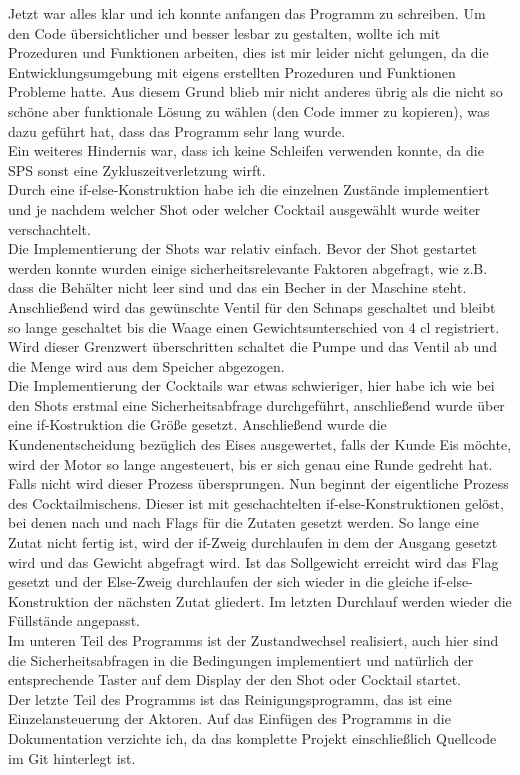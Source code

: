 \documentclass[10pt,a4paper]{report}
\begin{document}
	Jetzt war alles klar und ich konnte anfangen das Programm zu schreiben. Um den Code übersichtlicher und besser lesbar zu gestalten, wollte ich mit Prozeduren und Funktionen arbeiten, dies ist mir leider nicht gelungen, da die Entwicklungsumgebung mit eigens erstellten Prozeduren und Funktionen Probleme hatte. Aus diesem Grund blieb mir nicht anderes übrig als die nicht so schöne aber funktionale Lösung zu wählen (den Code immer zu kopieren), was dazu geführt hat, dass das Programm sehr lang wurde.\\
	Ein weiteres Hindernis war, dass ich keine Schleifen verwenden konnte, da die SPS sonst eine Zykluszeitverletzung wirft.\\
	Durch eine if-else-Konstruktion habe ich die einzelnen Zustände implementiert und je nachdem welcher Shot oder welcher Cocktail ausgewählt wurde weiter verschachtelt.\\
	Die Implementierung der Shots war relativ einfach. Bevor der Shot gestartet werden konnte wurden einige sicherheitsrelevante Faktoren abgefragt, wie z.B. dass die Behälter nicht leer sind und das ein Becher in der Maschine steht. Anschließend wird das gewünschte Ventil für den Schnaps geschaltet und bleibt so lange geschaltet bis die Waage einen Gewichtsunterschied von 4 cl registriert. Wird dieser Grenzwert überschritten schaltet die Pumpe und das Ventil ab und die Menge wird aus dem Speicher abgezogen.\\
	Die Implementierung der Cocktails war etwas schwieriger, hier habe ich wie bei den Shots erstmal eine Sicherheitsabfrage durchgeführt, anschließend wurde über eine if-Kostruktion die Größe gesetzt. Anschließend wurde die Kundenentscheidung bezüglich des Eises ausgewertet, falls der Kunde Eis möchte, wird der Motor so lange angesteuert, bis er sich genau eine Runde gedreht hat. Falls nicht wird dieser Prozess übersprungen. Nun beginnt der eigentliche Prozess des Cocktailmischens. Dieser ist mit geschachtelten if-else-Konstruktionen gelöst, bei denen nach und nach Flags für die Zutaten gesetzt werden. So lange eine Zutat nicht fertig ist, wird der if-Zweig durchlaufen in dem der Ausgang gesetzt wird und das Gewicht abgefragt wird. Ist das Sollgewicht erreicht wird das Flag gesetzt und der Else-Zweig durchlaufen der sich wieder in die gleiche if-else-Konstruktion der nächsten Zutat gliedert. Im letzten Durchlauf werden wieder die Füllstände angepasst.\\
	Im unteren Teil des Programms ist der Zustandwechsel realisiert, auch hier sind die Sicherheitsabfragen in die Bedingungen implementiert und natürlich der entsprechende Taster auf dem Display der den Shot oder Cocktail startet.\\
	Der letzte Teil des Programms ist das Reinigungsprogramm, das ist eine Einzelansteuerung der Aktoren. Auf das Einfügen des Programms in die Dokumentation verzichte ich, da das komplette Projekt einschließlich Quellcode im Git hinterlegt ist.\\
	   
\end{document}
